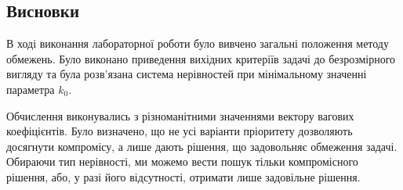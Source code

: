 \subsection{Висновки}
В ході виконання лабораторної роботи було вивчено загальні положення методу обмежень. Було виконано приведення вихідних критеріїв задачі до безрозмірного вигляду та була розв’язана система нерівностей при мінімальному значенні параметра $k_0$.

Обчислення виконувались з різноманітними значеннями вектору вагових коефіцієнтів. Було визначено, що не усі варіанти пріоритету дозволяють досягнути компромісу, а лише дають рішення, що задовольняє обмеження задачі. Обираючи тип нерівності, ми можемо вести пошук тільки компромісного рішення, або, у разі його відсутності, отримати лише задовільне рішення.


